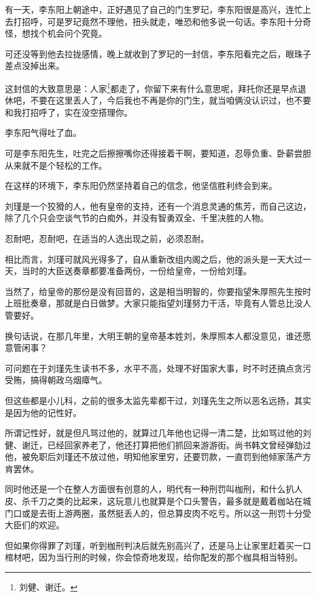 \begin{multicols}{\theparacolNo}
有一天，李东阳上朝途中，正好遇见了自己的门生罗玘，李东阳很是高兴，连忙上去打招呼，可是罗玘竟然不理他，扭头就走，唯恐和他多说一句话。李东阳十分奇怪，想找个机会问个究竟。

可还没等到他去拉拢感情，晚上就收到了罗玘的一封信，李东阳看完之后，眼珠子差点没掉出来。

这封信的大致意思是：人家\footnote{刘健、谢迁。}都走了，你留下来有什么意思呢，拜托你还是早点退休吧，不要在这里丢人了，今后我也不再是你的门生，就当咱俩没认识过，也不要和我打招呼了，实在没空搭理你。

李东阳气得吐了血。

可是李东阳先生，吐完之后擦擦嘴你还得接着干啊，要知道，忍辱负重、卧薪尝胆从来就不是个轻松的工作。

在这样的环境下，李东阳仍然坚持着自己的信念，他坚信胜利终会到来。

刘瑾是一个狡猾的人，他有皇帝的支持，还有一个消息灵通的焦芳，而自己这边，除了几个只会空谈气节的白痴外，并没有智勇双全、千里决胜的人物。

忍耐吧，忍耐吧，在适当的人选出现之前，必须忍耐。

相比而言，刘瑾可就风光得多了，自从重新改组内阁之后，他的派头是一天大过一天，当时的大臣送奏章都要准备两份，一份给皇帝，一份给刘瑾。

当然了，给皇帝的那份是没有回音的，这是相当明智的，你要指望朱厚照先生按时上班批奏章，那就是白日做梦。大家只能指望刘瑾努力干活，毕竟有人管总比没人管要好。

换句话说，在那几年里，大明王朝的皇帝基本姓刘，朱厚照本人都没意见，谁还愿意管闲事？

可问题在于刘瑾先生读书不多，水平不高，处理不好国家大事，时不时还搞点贪污受贿，搞得朝政乌烟瘴气。

但这些都是小儿科，之前的很多太监先辈都干过，刘瑾先生之所以恶名远扬，其实是因为他的记性好。

所谓记性好，就是但凡骂过他的，就算过几年他也记得一清二楚，比如骂过他的刘健、谢迁，已经回家养老了，他还打算把他们抓回来游游街。尚书韩文曾经弹劾过他，被免职后刘瑾还不放过他，明知他家里穷，还要罚款，一直罚到他倾家荡产方肯罢休。

同时他还是一个在整人方面很有创意的人，明代有一种刑罚叫枷刑，和什么扒人皮、杀千刀之类的比起来，这玩意儿也就算是个口头警告，最多就是戴着枷站在城门口或是去街上游两圈，虽然挺丢人的，但总算皮肉不吃亏。所以这一刑罚十分受大臣们的欢迎。

但如果你得罪了刘瑾，听到枷刑判决后就先别高兴了，还是马上让家里赶着买一口棺材吧，因为当行刑的时候，你会惊奇地发现，给你配发的那个枷具相当特别。


\end{multicols}
